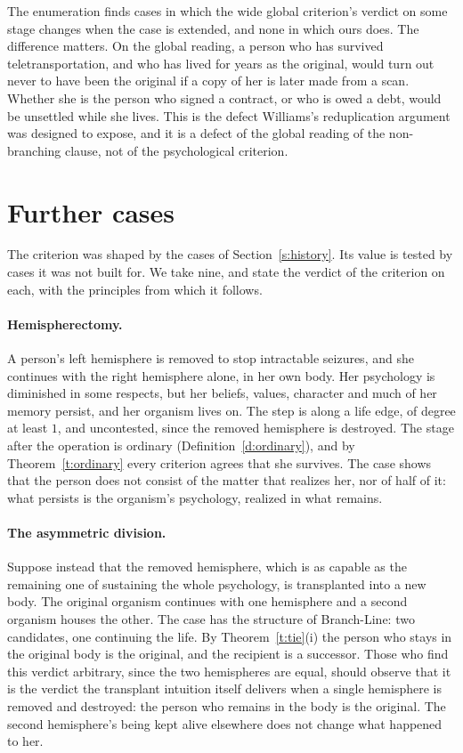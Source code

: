 \documentclass{situationist-preprint}
\begin{document}
The enumeration finds \stwidenonlocal{} cases in which the wide global criterion's verdict on some stage changes when the case is extended, and none in which ours does. The difference matters. On the global reading, a person who has survived teletransportation, and who has lived for years as the original, would turn out never to have been the original if a copy of her is later made from a scan. Whether she is the person who signed a contract, or who is owed a debt, would be unsettled while she lives. This is the defect Williams's reduplication argument was designed to expose, and it is a defect of the global reading of the non-branching clause, not of the psychological criterion.

\section{Further cases}\label{s:further}

The criterion was shaped by the cases of Section~\ref{s:history}. Its value is tested by cases it was not built for. We take nine, and state the verdict of the criterion on each, with the principles from which it follows.

\paragraph{Hemispherectomy.} A person's left hemisphere is removed to stop intractable seizures, and she continues with the right hemisphere alone, in her own body. Her psychology is diminished in some respects, but her beliefs, values, character and much of her memory persist, and her organism lives on. The step is along a life edge, of degree at least $1$, and uncontested, since the removed hemisphere is destroyed. The stage after the operation is ordinary (Definition~\ref{d:ordinary}), and by Theorem~\ref{t:ordinary} every criterion agrees that she survives. The case shows that the person does not consist of the matter that realizes her, nor of half of it: what persists is the organism's psychology, realized in what remains.

\paragraph{The asymmetric division.} Suppose instead that the removed hemisphere, which is as capable as the remaining one of sustaining the whole psychology, is transplanted into a new body. The original organism continues with one hemisphere and a second organism houses the other. The case has the structure of Branch-Line: two candidates, one continuing the life. By Theorem~\ref{t:tie}(i) the person who stays in the original body is the original, and the recipient is a successor. Those who find this verdict arbitrary, since the two hemispheres are equal, should observe that it is the verdict the transplant intuition itself delivers when a single hemisphere is removed and destroyed: the person who remains in the body is the original. The second hemisphere's being kept alive elsewhere does not change what happened to her.
\end{document}
